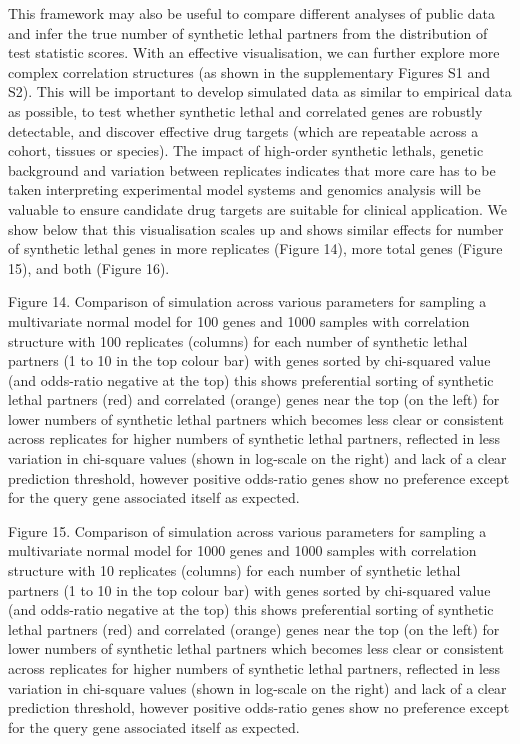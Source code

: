 This framework may also be useful to compare different analyses of public data and infer the true number of \gls{synthetic lethal} partners from the distribution of test statistic scores.  With an effective visualisation, we can further explore more complex correlation structures (as shown in the supplementary Figures S1 and S2).  This will be important to develop simulated data as similar to empirical data as possible, to test whether \gls{synthetic lethal} and correlated genes are robustly detectable, and discover effective drug targets (which are repeatable across a cohort, tissues or species).  The impact of high-order \glspl{synthetic lethal}, genetic background and variation between replicates indicates that more care has to be taken interpreting experimental model systems and \glspl{genomic} analysis will be valuable to ensure candidate drug targets are suitable for clinical application.  We show below that this visualisation scales up and shows similar effects for number of \gls{synthetic lethal} genes in more replicates (Figure 14), more total genes (Figure 15), and both (Figure 16).
    
Figure 14.  Comparison of simulation across various parameters for sampling a multivariate normal model for 100 genes and 1000 samples with correlation structure with 100 replicates (columns) for each number of \gls{synthetic lethal} partners (1 to 10 in the top colour bar) with genes sorted by chi-squared value (and odds-ratio negative at the top) this shows preferential sorting of \gls{synthetic lethal} partners (red) and correlated (orange) genes near the top (on the left) for lower numbers of \gls{synthetic lethal} partners which becomes less clear or consistent across replicates for higher numbers of \gls{synthetic lethal} partners, reflected in less variation in chi-square values (shown in log-scale on the right) and lack of a clear prediction threshold, however positive odds-ratio genes show no preference except for the query gene associated itself as expected.  
   
Figure 15.  Comparison of simulation across various parameters for sampling a multivariate normal model for 1000 genes and 1000 samples with correlation structure with 10 replicates (columns) for each number of \gls{synthetic lethal} partners (1 to 10 in the top colour bar) with genes sorted by chi-squared value (and odds-ratio negative at the top) this shows preferential sorting of \gls{synthetic lethal} partners (red) and correlated (orange) genes near the top (on the left) for lower numbers of \gls{synthetic lethal} partners which becomes less clear or consistent across replicates for higher numbers of \gls{synthetic lethal} partners, reflected in less variation in chi-square values (shown in log-scale on the right) and lack of a clear prediction threshold, however positive odds-ratio genes show no preference except for the query gene associated itself as expected.
    
